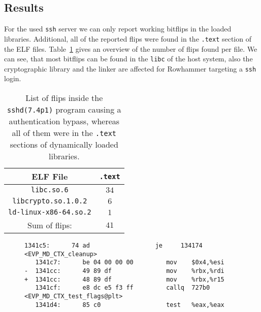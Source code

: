 \subsection{Results}

For the used \texttt{ssh} server we can only report working bitflips in the
loaded libraries. Additional, all of the reported flips were found in the
\texttt{.text} section of the ELF files. Table~\ref{tab:sshdres} gives an
overview of the number of flips found per file. We can see, that most bitflips
can be found in the \texttt{libc} of the host system, also the cryptographic
library and the linker are affected for Rowhammer targeting a \texttt{ssh}
login.

\begin{table}[!htb]
\centering
\begin{tabular}{c|c}
ELF File               & \texttt{.text} \\ \hline
\texttt{libc.so.6}         & $34$ \\
\texttt{libcrypto.so.1.0.2} & $6$ \\
\texttt{ld-linux-x86-64.so.2} & $1$ \\ \hline
Sum of flips:                 & $41$
\end{tabular}
\caption{List of flips inside the \texttt{sshd(7.4p1)} program
causing a authentication bypass, whereas all of them were in the \texttt{.text}
sections of dynamically loaded libraries.}
\label{tab:sshdres}
\end{table}

\begin{figure}
\begin{minipage}{\linewidth}
\begin{lstlisting}[style=diff,
                   caption={Diff for a bitflip applied to the
\texttt{libcrypto.so.1.0.2} binary in order to bypass a credential check. The
move from \texttt{rbx} to \texttt{rdi} is exchanged with a move to
\texttt{r15}, this changes the parameter for \texttt{EVP\_MD\_CTX\_test\_flags},
which is highly likely to result in a different outcome.},
label=lst:sshdex]
   1341c5:      74 ad                  je     134174 <EVP_MD_CTX_cleanup>
   1341c7:      be 04 00 00 00         mov    $0x4,%esi
-  1341cc:      49 89 df               mov    %rbx,%rdi
+  1341cc:      48 89 df               mov    %rbx,%r15
   1341cf:      e8 dc e5 f3 ff         callq  727b0 <EVP_MD_CTX_test_flags@plt>
   1341d4:      85 c0                  test   %eax,%eax
\end{lstlisting}
\end{minipage}
\end{figure}

